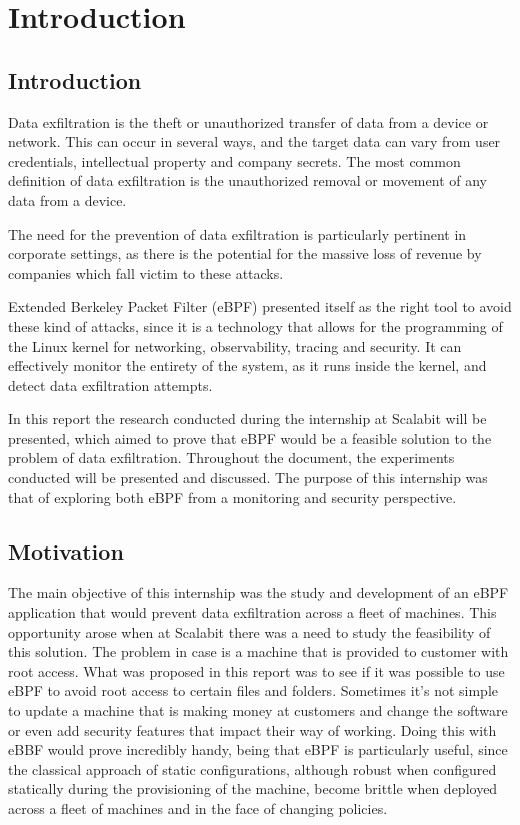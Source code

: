 \chapter{Introduction}
\label{chap:int}


\section{Introduction}

Data exfiltration is the theft or unauthorized transfer of data from a device or network. This can occur in several ways, and the target data can vary from user credentials, intellectual property and company secrets.
The most common definition of data exfiltration is the unauthorized removal or movement of any data from a device.

The need for the prevention of data exfiltration is particularly pertinent in corporate settings, as there is the potential for the massive loss of revenue by companies which fall victim to these attacks.

Extended Berkeley Packet Filter (eBPF) presented itself as the right tool to avoid these kind of attacks, since it is a technology that allows for the programming of the Linux kernel for networking, observability, tracing and security. It can effectively monitor the entirety of the system, as it runs inside the kernel, and detect data exfiltration attempts.

In this report the research conducted during the internship at Scalabit will be presented, which aimed to prove that eBPF would be a feasible solution to the problem of data exfiltration. Throughout the document, the experiments conducted will be presented and discussed. The purpose of this internship was that of exploring both eBPF from a monitoring and security perspective.

\section{Motivation}

The main objective of this internship was the study and development of an eBPF application that would prevent data exfiltration across a fleet of machines. This opportunity arose when at Scalabit there was a need to study the feasibility of this solution.
The problem in case is a machine that is provided to customer with root access.
What was proposed in this report was to see if it was possible to use eBPF to avoid root access to certain files and folders.
Sometimes it's not simple to update a machine that is making money at customers and change the software or even add security features that impact their way of working.
Doing this with eBBF would prove incredibly handy, being that eBPF is particularly useful, since the classical approach of static configurations, although robust when configured statically during the provisioning of the machine, become brittle when deployed across a fleet of machines and in the face of changing policies.

